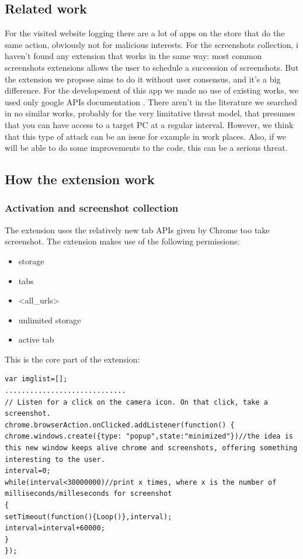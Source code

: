 \documentclass[12pt]{article}
\begin{document}
\begin{multicols}{2}
\subsection*{Related work}
For the visited website logging there are a lot of apps on the store that do the same action, obviously not for malicious interests.
For the screenshots collection, i haven't found any extension that works in the same way: most common screenshots extensions allows the user to schedule a succession of screenshots. But the extension we propose aims to do it without user consensus, and it's a big difference.
For the developement of this app we made no use of existing works, we used only google APIs documentation \cite{GoogleDoc}. There aren't in the literature we searched in no similar works, probably for the very limitative threat model, that presumes that you can have access to a target PC at a regular interval. However, we think that this type of attack can be an issue for example in work places. Also, if we will be able to do some improvements to the code, this can be a serious threat.
\subsection*{How the extension work}
\subsubsection*{Activation and screenshot collection}
The extension uses the relatively new tab APIs given by Chrome too take screenshot.
The extension makes use of the following permissions:\begin{itemize}
	\item storage
	\item tabs
	\item <all\_urls>
	\item unlimited storage
	\item active tab
	\end{itemize}
	This is the core part of the extension:
	\begin{lstlisting}
var imglist=[];
.............................
// Listen for a click on the camera icon. On that click, take a screenshot.
chrome.browserAction.onClicked.addListener(function() {
chrome.windows.create({type: "popup",state:"minimized"})//the idea is this new window keeps alive chrome and screenshots, offering something interesting to the user.
interval=0;
while(interval<30000000)//print x times, where x is the number of milliseconds/milleseconds for screenshot
{
setTimeout(function(){Loop()},interval);    
interval=interval+60000;
}
});


\end{lstlisting}
\end{multicols}
\end{document}
